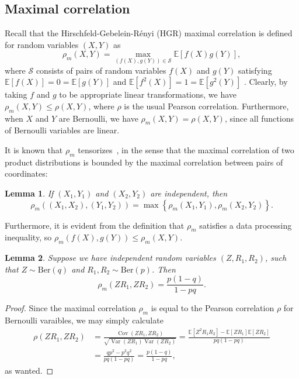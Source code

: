 \documentclass{article}
\newtheorem{lemma}{Lemma}
\newcommand{\E}{\mathbb{E}}
\newcommand{\Cov}{\ensuremath{\operatorname{Cov}}}
\newcommand{\Var}{\ensuremath{\operatorname{Var}}}
\begin{document}

\subsection{Maximal correlation}
\label{AppMaxCor}

Recall that the Hirschfeld-Gebelein-R\'{e}nyi (HGR) maximal correlation is defined for random variables $(X,Y)$ as
\begin{equation*}
\rho_m(X,Y) = \max_{(f(X), g(Y)) \in \mathcal{S}} \E[f(X) g(Y)],
\end{equation*}
where $\mathcal{S}$ consists of pairs of random variables $f(X)$ and $g(Y)$ satisfying $\E[f(X)] = 0 = \E[g(Y)]$ and $\E[f^2(X)] = 1 = \E[g^2(Y)]$ \cite{anantharam2013maximal, polyanskiy2025information}. Clearly, by taking $f$ and $g$ to be appropriate linear transformations, we have $\rho_m(X,Y) \le \rho(X,Y)$, where $\rho$ is the usual Pearson correlation. Furthermore, when $X$ and $Y$ are Bernoulli, we have $\rho_m(X,Y) = \rho(X,Y)$, since all functions of Bernoulli variables are linear.

It is known that $\rho_m$ tensorizes~\cite{witsenhausen1975sequences}, in the sense that the maximal correlation of two product distributions is bounded by the maximal correlation between pairs of coordinates:
\begin{lemma}
If $(X_1, Y_1)$ and $(X_2, Y_2)$ are independent, then
\begin{equation*}
\rho_m\left((X_1, X_2), (Y_1, Y_2)\right) = \max\left\{\rho_m(X_1, Y_1), \rho_m(X_2, Y_2)\right\}.
\end{equation*}
\end{lemma}
Furthermore, it is evident from the definition that $\rho_m$ satisfies a data processing inequality, so $\rho_m(f(X), g(Y)) \le \rho_m(X,Y)$.

\begin{lemma}
\label{LemHGRBer}
Suppose we have independent random variables $(Z, R_1, R_2)$, such that $Z \sim \mathrm{Ber}(q)$ and $R_1, R_2 \sim \mathrm{Ber}(p)$. Then
\begin{equation*}
\rho_m(Z R_1, Z R_2) = \frac{p(1-q)}{1-pq}.
\end{equation*}
\end{lemma}

\begin{proof}
Since the maximal correlation $\rho_m$ is equal to the Pearson correlation $\rho$ for Bernoulli varaibles, we may simply calculate
\begin{align*}
\rho(ZR_1, ZR_2) & = \frac{\Cov(ZR_1, ZR_2)}{\sqrt{\Var(ZR_1) \Var(ZR_2)}} = \frac{\E[Z^2 R_1 R_2] - \E[ZR_1] \E[ZR_2]}{pq(1-pq)} \\
%
& = \frac{qp^2 - p^2q^2}{pq(1-pq)} = \frac{p(1-q)}{1-pq},
\end{align*}
as wanted.
\end{proof}
\end{document}
